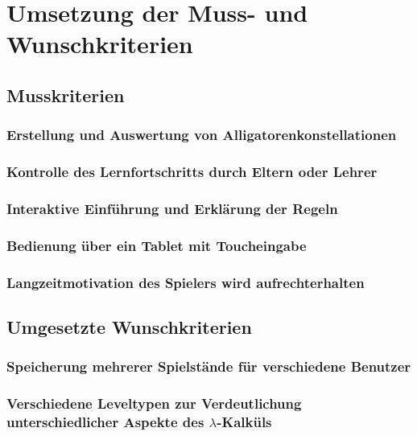 \chapter{Umsetzung der Muss- und Wunschkriterien}


\section{Musskriterien}

\subsection{Erstellung und Auswertung von Alligatorenkonstellationen}

\subsection{Kontrolle des Lernfortschritts durch Eltern oder Lehrer}

\subsection{Interaktive Einführung und Erklärung der Regeln}

\subsection{Bedienung über ein Tablet mit Toucheingabe}

\subsection{Langzeitmotivation des Spielers wird aufrechterhalten}


\section{Umgesetzte Wunschkriterien}

\subsection{Speicherung mehrerer Spielstände für verschiedene Benutzer}

\subsection{Verschiedene Leveltypen zur Verdeutlichung unterschiedlicher Aspekte des \(\lambda\)-Kalküls}

